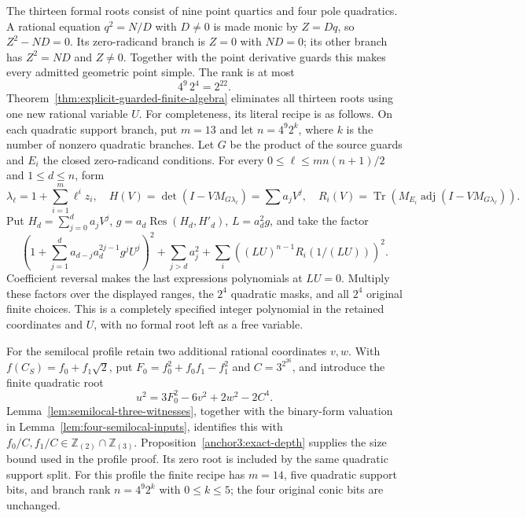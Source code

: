 \documentclass[11pt,a4paper]{article}
\theoremstyle{definition}
\theoremstyle{remark}
\begin{document}
The thirteen formal roots consist of nine point quartics and four
pole quadratics.  A rational equation $q^2=N/D$ with $D\ne0$ is
made monic by $Z=Dq$, so $Z^2-ND=0$.  Its zero-radicand branch is
$Z=0$ with $ND=0$; its other branch has $Z^2=ND$ and $Z\ne0$.
Together with the point derivative guards this makes every admitted
geometric point simple.  The rank is at most
\[
                              4^9\,2^4=2^{22}.
\]
Theorem~\ref{thm:explicit-guarded-finite-algebra} eliminates all thirteen
roots using one new rational variable $U$.  For completeness, its
literal recipe is as follows.  On each quadratic support branch,
put $m=13$ and let $n=4^9 2^k$, where $k$ is the number of nonzero
quadratic branches.  Let $G$ be the product of the source guards and $E_i$ the closed
zero-radicand conditions.  For every
$0\le\ell\le mn(n+1)/2$ and $1\le d\le n$, form
\[
 \lambda_\ell=1+\sum_{i=1}^m\ell^iz_i,\quad
 H(V)=\det(I-VM_{G\lambda_\ell})=\sum a_jV^j,
 \quad R_i(V)=\operatorname{Tr}(M_{E_i}\operatorname{adj}(I-VM_{G\lambda_\ell})).
\]
Put $H_d=\sum_{j=0}^d a_jV^j$,
$g=a_d\operatorname{Res}(H_d,H'_d)$, $L=a_d^2g$, and take the factor
\[
 \left(1+\sum_{j=1}^d a_{d-j}a_d^{2j-1}g^jU^j\right)^2
       +\sum_{j>d}a_j^2
       +\sum_i\left((LU)^{n-1}R_i(1/(LU))\right)^2.
\]
Coefficient reversal makes the last expressions polynomials at
$LU=0$.  Multiply these factors over the displayed ranges, the
$2^4$ quadratic masks, and all $2^4$ original finite choices.
This is a completely specified integer polynomial in the retained
coordinates and $U$, with no formal root left as a free variable.

For the semilocal profile retain two additional rational coordinates
$v,w$.  With $f(C_S)=f_0+f_1\sqrt2$, put
$F_0=f_0^2+f_0f_1-f_1^2$ and $C=3^{2^{26}}$, and introduce the
finite quadratic root
\[
                 u^2=3F_0^2-6v^2+2w^2-2C^4.
\]
Lemma~\ref{lem:semilocal-three-witnesses}, together with the binary-form valuation in Lemma~\ref{lem:four-semilocal-inputs}, identifies this with
$f_0/C,f_1/C\in\mathbb Z_{(2)}\cap\mathbb Z_{(3)}$.
Proposition~\ref{anchor3:exact-depth} supplies the size bound used in the profile
proof.  Its zero root is included by the same quadratic support split.
For this profile the finite recipe has $m=14$, five quadratic support
bits, and branch rank $n=4^9 2^k$ with $0\le k\le5$; the four
original conic bits are unchanged.
\end{document}
